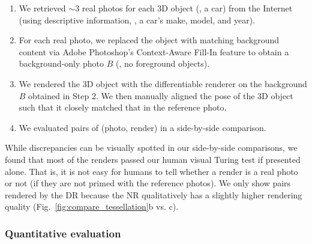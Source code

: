 \documentclass[10pt,twocolumn,letterpaper]{article}
\begin{document}
\begin{enumerate}
	\item We retrieved $\sim$3 real photos for each 3D object (\eg, a car) from the Internet (using descriptive information, \eg, a car's make, model, and year).
	\item For each real photo, we replaced the object with matching background content via Adobe Photoshop's Context-Aware Fill-In feature to obtain a background-only photo $B$ (\ie, no foreground objects).
	\item We rendered the 3D object with the differentiable renderer on the background $B$ obtained in Step 2.
	We then manually aligned the pose of the 3D object such that it closely matched that in the reference photo.
	\item We evaluated pairs of (photo, render) in a side-by-side comparison.
\end{enumerate}

While discrepancies can be visually spotted in our side-by-side comparisons, we found that most of the renders passed our human visual Turing test if presented alone.
That is, it is not easy for humans to tell whether a render is a real photo or not (if they are not primed with the reference photos).
We only show pairs rendered by the DR because the NR qualitatively has a slightly higher rendering quality (Fig.~\ref{fig:compare_tessellation}b vs. c).

\subsubsection{Quantitative evaluation} 
\label{sec:quantitative_eval}

\end{document}

